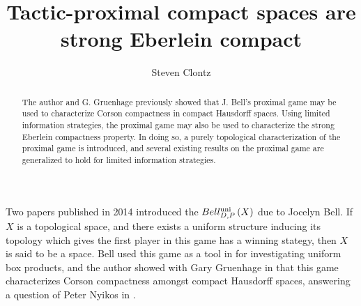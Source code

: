 \documentclass{amsart}
\theoremstyle{definition}
\begin{document}
\title{Tactic-proximal compact spaces are strong Eberlein compact}




\author{Steven Clontz}
\address{Department of Mathematics, Auburn University,
Auburn, AL 36830}




\begin{abstract}
The author and G. Gruenhage previously showed that J. Bell's proximal game may
be used to characterize Corson compactness in compact Hausdorff spaces.
Using limited information strategies, the proximal game may also be
used to characterize the strong Eberlein compactness property.
In doing so, a purely topological characterization of the proximal game
is introduced, and several existing results on
the proximal game are generalized to hold for limited information strategies.
\end{abstract}


\maketitle

Two papers published in 2014 introduced the 
$Bell_{D,P}^{\textrm{uni}}\left({X}\right)$ due to Jocelyn Bell. If $X$ is a
topological space, and there exists a uniform structure inducing its topology
which gives the first player in this game has a winning stategy,
then $X$ is said to be a  space. Bell used this
game as a tool in \cite{MR3239205} for investigating uniform box products,
and the author showed with Gary Gruenhage in \cite{MR3227201} that
this game characterizes Corson compactness amongst compact Hausdorff spaces,
answering a question of Peter Nyikos in \cite{nyikosProximalPreprint}.
\end{document}
